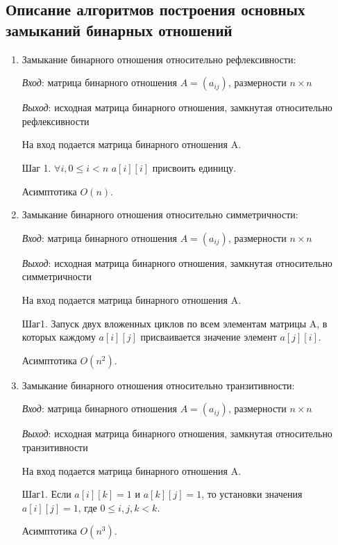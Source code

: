 \documentclass[spec, och, labwork]{shiza}
\begin{document}
        \subsection{Описание алгоритмов построения основных замыканий бинарных отношений}
            \begin{enumerate}
                
                \item Замыкание бинарного отношения относительно рефлексивности:
                
                \textit{Вход}: матрица бинарного отношения $A = (a_{ij})$, размерности $n \times n$

                \textit{Выход}: исходная матрица бинарного отношения, замкнутая относительно рефлексивности

                На вход подается матрица бинарного отношения A.

                Шаг 1. $\forall i, 0 \leq i < n$ $a[i][i]$ присвоить единицу.

                Асимптотика $O(n)$.

                \item Замыкание бинарного отношения относительно симметричности:
                
                \textit{Вход}: матрица бинарного отношения $A = (a_{ij})$, размерности $n \times n$

                \textit{Выход}: исходная матрица бинарного отношения, замкнутая относительно симметричности

                На вход подается матрица бинарного отношения A.

                Шаг1. Запуск двух вложенных циклов по всем элементам матрицы A, в которых каждому $a[i][j]$ присваивается значение элемент
                $a[j][i]$.

                Асимптотика $O(n^2)$.

                \item Замыкание бинарного отношения относительно транзитивности:
                
                \textit{Вход}: матрица бинарного отношения $A = (a_{ij})$, размерности $n \times n$

                \textit{Выход}: исходная матрица бинарного отношения, замкнутая относительно транзитивности

                На вход подается матрица бинарного отношения A.

                Шаг1. Если $a[i][k] = 1$ и $a[k][j] = 1$, то установки значения $a[i][j] = 1$, где $0 \leq i,j,k < k$.

                Асимптотика $O(n^3)$.
            \end{enumerate}
    
\end{document}
